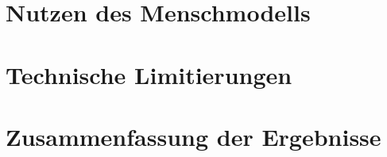 \section{Nutzen des Menschmodells}\label{sec:NutzenMenschmodell}

\lipsum[3]

\section{Technische Limitierungen}\label{sec:TechnischeLimitsMenschmodell}

\lipsum[3]

\section{Zusammenfassung der Ergebnisse}\label{sec:ZusammenfassungMenschmodell}

\lipsum[3]

